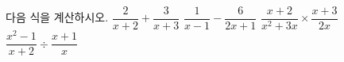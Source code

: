 다음 식을 계산하시오.
 $\dfrac{2}{x+2}+\dfrac{3}{x+3}$
 $\dfrac{1}{x-1}-\dfrac{6}{2x+1}$
 $\dfrac{x+2}{x^2+3x}\times\dfrac{x+3}{2x}$
 $\dfrac{x^2-1}{x+2}\div\dfrac{x+1}{x}$
